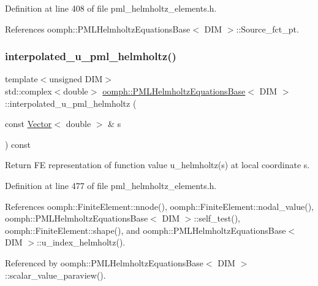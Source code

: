 Definition at line 408 of file pml\+\_\+helmholtz\+\_\+elements.\+h.



References oomph\+::\+P\+M\+L\+Helmholtz\+Equations\+Base$<$ D\+I\+M $>$\+::\+Source\+\_\+fct\+\_\+pt.

\mbox{\label{classoomph_1_1PMLHelmholtzEquationsBase_aa9583162d7aa5422957ecff9ab189f3b}} 
\subsubsection{\texorpdfstring{interpolated\+\_\+u\+\_\+pml\+\_\+helmholtz()}{interpolated\_u\_pml\_helmholtz()}}
{\footnotesize\ttfamily template$<$unsigned D\+IM$>$ \\
std\+::complex$<$double$>$ \hyperlink{classoomph_1_1PMLHelmholtzEquationsBase}{oomph\+::\+P\+M\+L\+Helmholtz\+Equations\+Base}$<$ D\+IM $>$\+::interpolated\+\_\+u\+\_\+pml\+\_\+helmholtz (\begin{DoxyParamCaption}\item[{const \hyperlink{classoomph_1_1Vector}{Vector}$<$ double $>$ \&}]{s }\end{DoxyParamCaption}) const\hspace{0.3cm}{\ttfamily [inline]}}



Return FE representation of function value u\+\_\+helmholtz(s) at local coordinate s. 



Definition at line 477 of file pml\+\_\+helmholtz\+\_\+elements.\+h.



References oomph\+::\+Finite\+Element\+::nnode(), oomph\+::\+Finite\+Element\+::nodal\+\_\+value(), oomph\+::\+P\+M\+L\+Helmholtz\+Equations\+Base$<$ D\+I\+M $>$\+::self\+\_\+test(), oomph\+::\+Finite\+Element\+::shape(), and oomph\+::\+P\+M\+L\+Helmholtz\+Equations\+Base$<$ D\+I\+M $>$\+::u\+\_\+index\+\_\+helmholtz().



Referenced by oomph\+::\+P\+M\+L\+Helmholtz\+Equations\+Base$<$ D\+I\+M $>$\+::scalar\+\_\+value\+\_\+paraview().

